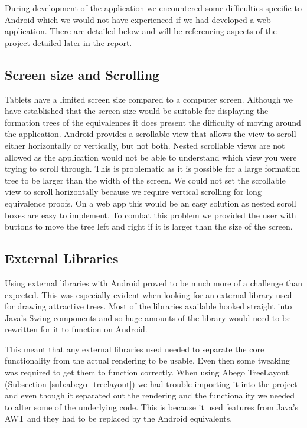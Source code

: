 \documentclass[draft]{report}
\begin{document}
During development of the application we encountered some difficulties specific to Android which we would not have experienced if we had developed a web application. There are detailed below and will be referencing aspects of the project detailed later in the report.

\subsection{Screen size and Scrolling}

Tablets have a limited screen size compared to a computer screen. Although we have established that the screen size would be suitable for displaying the formation trees of the equivalences it does present the difficulty of moving around the application. Android provides a scrollable view that allows the view to scroll either horizontally or vertically, but not both. Nested scrollable views are not allowed as the application would not be able to understand which view you were trying to scroll through. This is problematic as it is possible for a large formation tree to be larger than the width of the screen. We could not set the scrollable view to scroll horizontally because we require vertical scrolling for long equivalence proofs. On a web app this would be an easy solution as nested scroll boxes are easy to implement. To combat this problem we provided the user with buttons to move the tree left and right if it is larger than the size of the screen.

\subsection{External Libraries}
\label{sub:external_libraries}

Using external libraries with Android proved to be much more of a challenge than expected. This was especially evident when looking for an external library used for drawing attractive trees. Most of the libraries available hooked straight into Java's Swing components and so huge amounts of the library would need to be rewritten for it to function on Android.

This meant that any external libraries used needed to separate the core functionality from the actual rendering to be usable. Even then some tweaking was required to get them to function correctly. When using Abego TreeLayout (Subsection \ref{sub:abego_treelayout}) we had trouble importing it into the project and even though it separated out the rendering and the functionality we needed to alter some of the underlying code. This is because it used features from Java's AWT and they had to be replaced by the Android equivalents. 
\end{document}
